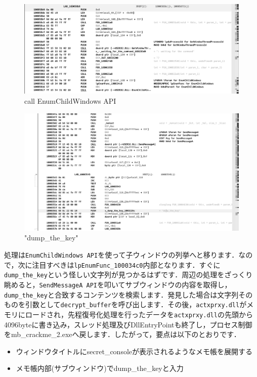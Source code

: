 \begin{figure}[H]
    \centering
    \includegraphics[width=\linewidth]{./assets/takuzoo3868asset/ghidra_007_gray.png}
    \caption{call EnumChildWindows API}
    \label{fig:ghdra_007}
\end{figure}
\begin{figure}[H]
    \centering
    \includegraphics[width=\linewidth]{./assets/takuzoo3868asset/ghidra_008_gray.png}
    \caption{"dump\_the\_key"}
    \label{fig:ghdra_008}
\end{figure}
処理は\texttt{EnumChildWindows API}を使って子ウィンドウの列挙へと移ります．なので，次に注目すべきは\texttt{lpEnumFunc\_100034c0}内部となります．すぐに\texttt{dump\_the\_key}という怪しい文字列が見つかるはずです．周辺の処理をざっくり眺めると，\texttt{SendMessageA API}を叩いてサブウィンドウの内容を取得し，\texttt{dump\_the\_key}と合致するコンテンツを検索します．発見した場合は文字列そのものを引数として\texttt{decrypt\_buffer}を呼び出します．その後，\texttt{actxprxy.dll}がメモリにロードされ，先程復号化処理を行ったデータを\texttt{actxprxy.dll}の先頭から4096byteに書き込み，スレッド処理及びDllEntryPointも終了し，プロセス制御をmb\_crackme\_2.exeへ戻します．したがって，要点は以下のとおりです．
\begin{itemize}
  \item ウィンドウタイトルにsecret\_consoleが表示されるようなメモ帳を展開する
  \item メモ帳内部(サブウィンドウ)でdump\_the\_keyと入力
\end{itemize}
